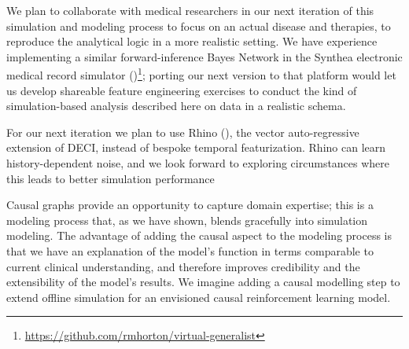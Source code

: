 
We plan to collaborate with medical researchers in our next iteration of this simulation and modeling process to focus on an actual disease and therapies, to reproduce the analytical logic in a more realistic setting. We have experience implementing a similar forward-inference Bayes Network in the Synthea electronic medical record simulator (\cite{synthea})\footnote{\url{https://github.com/rmhorton/virtual-generalist}}; porting our next version to that platform would let us develop shareable feature engineering exercises to conduct the kind of simulation-based analysis described here on data in a realistic schema.

For our next iteration we plan to use Rhino (\cite{gong2022rhino}), the vector auto-regressive extension of DECI, instead of bespoke temporal featurization. Rhino can learn history-dependent noise, and we look forward to exploring circumstances where this leads to better simulation performance

Causal graphs provide an opportunity to capture domain expertise; this is a modeling process that, as we have shown, blends gracefully into simulation modeling. 
The advantage of adding the causal aspect to the modeling process is that we have an explanation of the model's function in terms comparable to current clinical understanding, and therefore improves credibility and the extensibility of the model's results. We imagine adding a causal modelling step to extend offline simulation for an envisioned causal reinforcement learning model. 


